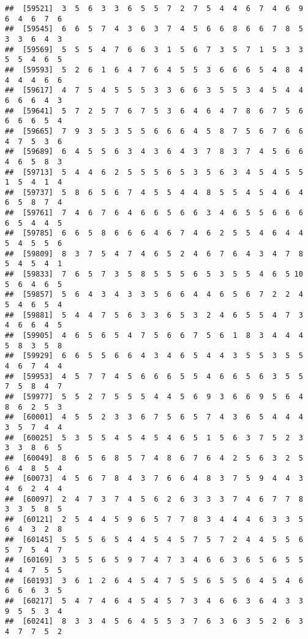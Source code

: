 \documentclass[
]{book}
\begin{document}
\begin{verbatim}
##  [59521]  3  5  6  3  3  6  5  5  7  2  7  5  4  4  6  7  4  6  9  6  4  6  7  6
##  [59545]  6  6  5  7  4  3  6  3  7  4  5  6  6  8  6  6  7  8  5  3  3  6  4  3
##  [59569]  5  5  5  4  7  6  6  3  1  5  6  7  3  5  7  1  5  3  3  5  5  4  6  5
##  [59593]  5  2  6  1  6  4  7  6  4  5  5  3  6  6  6  5  4  8  4  4  4  4  6  6
##  [59617]  4  7  5  4  5  5  5  3  3  6  6  3  5  5  3  4  5  4  4  6  6  6  4  3
##  [59641]  5  7  2  5  7  6  7  5  3  6  4  6  4  7  8  6  7  5  6  6  6  6  5  4
##  [59665]  7  9  3  5  3  5  5  6  6  6  4  5  8  7  5  6  7  6  6  4  7  5  3  6
##  [59689]  6  4  5  5  6  3  4  3  6  4  3  7  8  3  7  4  5  6  6  4  6  5  8  3
##  [59713]  5  4  4  6  2  5  5  5  6  5  3  5  6  3  4  5  4  5  5  1  5  4  1  4
##  [59737]  5  8  6  5  6  7  4  5  5  4  4  8  5  5  4  5  4  6  4  6  5  8  7  4
##  [59761]  7  4  6  7  6  4  6  6  5  6  6  3  4  6  5  5  6  6  6  6  5  4  4  5
##  [59785]  6  6  5  8  6  6  6  4  6  7  4  6  2  5  5  4  6  4  4  5  4  5  5  6
##  [59809]  8  3  7  5  4  7  4  6  5  2  4  6  7  6  4  3  4  7  8  5  4  5  4  1
##  [59833]  7  6  5  7  3  5  8  5  5  5  6  5  3  5  5  4  6  5 10  5  6  4  6  5
##  [59857]  5  6  4  3  4  3  3  5  6  6  4  4  6  5  6  7  2  2  4  5  4  6  5  4
##  [59881]  5  4  4  7  5  6  3  3  6  5  3  2  4  6  5  5  4  7  3  4  6  6  4  5
##  [59905]  4  6  5  6  5  4  7  5  6  6  7  5  6  1  8  3  4  4  4  5  8  3  5  8
##  [59929]  6  6  5  5  6  6  4  3  4  6  5  4  4  3  5  5  3  5  5  4  6  7  4  4
##  [59953]  4  5  7  7  4  5  6  6  6  5  5  4  6  6  5  6  3  5  5  7  5  8  4  7
##  [59977]  5  5  2  7  5  5  5  4  4  5  6  9  3  6  6  9  5  6  4  8  6  2  5  3
##  [60001]  4  5  5  2  3  3  6  7  5  6  5  7  4  3  6  5  4  4  4  3  5  7  4  4
##  [60025]  5  3  5  5  4  5  4  5  4  6  5  1  5  6  3  7  5  2  3  3  3  8  6  5
##  [60049]  8  6  5  6  8  5  7  4  8  6  7  6  4  2  5  6  3  2  5  6  4  8  5  4
##  [60073]  4  5  6  7  8  4  3  7  6  6  4  8  3  7  5  9  4  4  3  4  6  2  4  4
##  [60097]  2  4  7  3  7  4  5  6  2  6  3  3  3  7  4  6  7  7  8  3  3  5  8  5
##  [60121]  2  5  4  4  5  9  6  5  7  7  8  3  4  4  4  6  3  3  5  6  4  3  2  8
##  [60145]  5  5  5  6  5  4  4  5  4  5  7  5  7  2  4  4  5  5  6  5  7  5  4  7
##  [60169]  3  5  5  6  5  9  7  4  7  3  4  6  6  3  6  5  6  5  5  4  4  7  5  5
##  [60193]  3  6  1  2  6  4  5  4  7  5  5  6  5  5  6  4  5  4  6  6  6  6  3  5
##  [60217]  5  4  7  4  6  4  5  4  5  7  3  4  6  6  3  6  4  3  3  9  5  5  3  4
##  [60241]  8  3  3  4  5  6  4  5  5  3  7  6  3  6  3  5  2  6  3  4  7  7  5  2

\end{verbatim}
\end{document}
